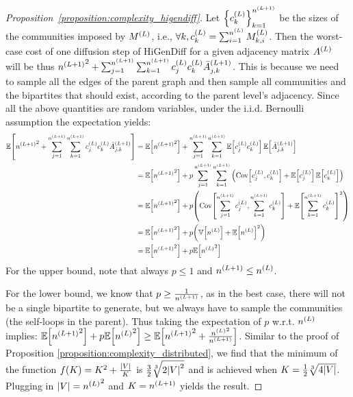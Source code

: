 \begin{proof}[Proposition~\ref{proposition:complexity_higendiff}]
Let $\offf{c^{\of{L}}_k}_{k=1}^{n^{\of{L+1}}}$ be the sizes of the communities imposed by $M^{\of{L}}$, i.e., $\forall k, c^{\of{L}}_k=\sum_{i=1}^{n^{\of{L}}}{M^{\of{L}}_{k,i}}$. Then the worst-case cost of one diffusion step of HiGenDiff for a given adjacency matrix $A^{\of{L}}$ will be thus ${n^{\of{L+1}}}^2 + \sum_{j=1}^{n^{\of{L+1}}}\sum_{k=1}^{n^{\of{L+1}}}{c^{\of{L}}_j c^{\of{L}}_k \bar{A}_{j,k}^{\of{L+1}}}$. This is because we need to sample all the edges of the parent graph and then sample all communities and the bipartites that should exist, according to the parent level's adjacency. Since all the above quantities are random variables, under the i.i.d. Bernoulli assumption the expectation yields:
\begin{align}
    \begin{split}
        \mathbb{E}\off{{n^{\of{L+1}}}^2 + \sum_{j=1}^{n^{\of{L+1}}}\sum_{k=1}^{n^{\of{L+1}}}{c^{\of{L}}_j c^{\of{L}}_k \bar{A}_{j,k}^{\of{L+1}}}} 
        &= \mathbb{E}\off{{n^{\of{L+1}}}^2}+\sum_{j=1}^{n^{\of{L+1}}}\sum_{k=1}^{n^{\of{L+1}}}{\mathbb{E}\off{c^{\of{L}}_j c^{\of{L}}_k} \mathbb{E}\off{\bar{A}_{j,k}^{\of{L+1}}}} \\
        &= \mathbb{E}\off{{n^{\of{L+1}}}^2}+p\sum_{j=1}^{n^{\of{L+1}}}\sum_{k=1}^{n^{\of{L+1}}}{\of{\mathrm{Cov}\off{c^{\of{L}}_j,c^{\of{L}}_k}+\mathbb{E}\off{c^{\of{L}}_j}\mathbb{E}\off{c^{\of{L}}_k}}} \\
        &= \mathbb{E}\off{{n^{\of{L+1}}}^2}+p\of{\mathrm{Cov}\off{\sum_{j=1}^{n^{\of{L+1}}}{c^{\of{L}}_j},\sum_{k=1}^{n^{\of{L+1}}}{c^{\of{L}}_k}}+\mathbb{E}\off{\sum_{k=1}^{n^{\of{L+1}}}{c^{\of{L}}_k}}^2}\\
         &= \mathbb{E}\off{{n^{\of{L+1}}}^2} +p \of{\mathbb{V}\off{n^{\of{L}}}+\mathbb{E}\off{n^{\of{L}}}^2} \\
          &= \mathbb{E}\off{{n^{\of{L+1}}}^2} + p\mathbb{E}\off{{n^{\of{L}}}^2}
    \end{split}
\end{align}
For the upper bound, note that always $p \leq 1$ and $n^{\of{L+1}} \leq n^{\of{L}}$.

For the lower bound, we know that $p \geq \frac{1}{n^{\of{L+1}}}$, as in the best case, there will not be a single bipartite to generate, but we always have to sample the communities (the self-loops in the parent). Thus taking the expectation of $p$ w.r.t. $n^{\of{L}}$ implies: $\mathbb{E}\off{{n^{\of{L+1}}}^2} +p\mathbb{E}\off{{n^{\of{L}}}^2} \geq \mathbb{E}\off{{n^{\of{L+1}}}^2 + \frac{{n^{\of{L}}}^2}{n^{\of{L+1}}}}$. Similar to the proof of Proposition \ref{proposition:complexity_distributed}, we find that the minimum of the function $f\of{K}=K^2+\frac{\abs{V}}{K}$ is $\frac{3}{2}\sqrt[3]{2\abs{V}^2}$ and is achieved when $K=\frac{1}{2}\sqrt[3]{4\abs{V}}$. Plugging in $\abs{V}={n^{\of{L}}}^2$ and $K=n^{\of{L+1}}$ yields the result.
\end{proof}

